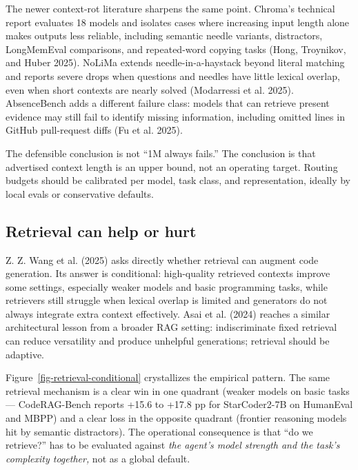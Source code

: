 \documentclass[
  11pt,
  letterpaper,
  numbers=noendperiod,
  parskip=half]{scrartcl}
\begin{document}
The newer context-rot literature sharpens the same point. Chroma's
technical report evaluates 18 models and isolates cases where increasing
input length alone makes outputs less reliable, including semantic
needle variants, distractors, LongMemEval comparisons, and repeated-word
copying tasks (Hong, Troynikov, and Huber 2025). NoLiMa extends
needle-in-a-haystack beyond literal matching and reports severe drops
when questions and needles have little lexical overlap, even when short
contexts are nearly solved (Modarressi et al. 2025). AbsenceBench adds a
different failure class: models that can retrieve present evidence may
still fail to identify missing information, including omitted lines in
GitHub pull-request diffs (Fu et al. 2025).

The defensible conclusion is not ``1M always fails.'' The conclusion is
that advertised context length is an upper bound, not an operating
target. Routing budgets should be calibrated per model, task class, and
representation, ideally by local evals or conservative defaults.

\subsection{Retrieval can help or hurt}\label{sec-retrieval-hard}

{Z. Z. Wang et al.} (2025) asks directly whether retrieval can augment
code generation. Its answer is conditional: high-quality retrieved
contexts improve some settings, especially weaker models and basic
programming tasks, while retrievers still struggle when lexical overlap
is limited and generators do not always integrate extra context
effectively. Asai et al. (2024) reaches a similar architectural lesson
from a broader RAG setting: indiscriminate fixed retrieval can reduce
versatility and produce unhelpful generations; retrieval should be
adaptive.

Figure~\ref{fig-retrieval-conditional} crystallizes the empirical pattern.
The same retrieval mechanism is a clear win in one quadrant
(weaker models on basic tasks --- CodeRAG-Bench reports +15.6 to +17.8 pp
for StarCoder2-7B on HumanEval and MBPP) and a clear loss in the opposite
quadrant (frontier reasoning models hit by semantic distractors). The
operational consequence is that ``do we retrieve?'' has to be evaluated
against \emph{the agent's model strength and the task's complexity
together,} not as a global default.

\figureRetrievalConditional
\end{document}
